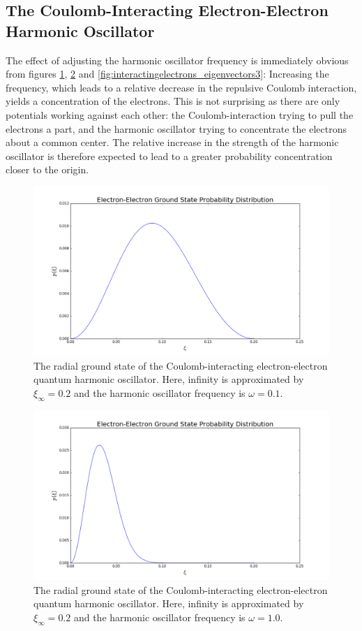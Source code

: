 \documentclass[reprint,english]{revtex4-1}
\begin{document}
\subsection{The Coulomb-Interacting Electron-Electron Harmonic Oscillator}
The effect of adjusting the harmonic oscillator frequency is immediately obvious from figures \ref{fig:interactingelectrons_eigenvectors1}, \ref{fig:interactingelectrons_eigenvectors2} and \ref{fig:interactingelectrons_eigenvectors3}: Increasing the frequency, which leads to a relative decrease in the repulsive Coulomb interaction, yields a concentration of the electrons. This is not surprising as there are only potentials working against each other: the Coulomb-interaction trying to pull the electrons a part, and the harmonic oscillator trying to concentrate the electrons about a common center. The relative increase in the strength of the harmonic oscillator is therefore expected to lead to a greater probability concentration closer to the origin.
\begin{figure}[h]
\centering
\includegraphics[scale=0.275]{InteractingElectrons/plots/prob200_1.png}
\caption{The radial ground state of the Coulomb-interacting electron-electron quantum harmonic oscillator. Here, infinity is approximated by \(\xi_\infty=0.2\) and the harmonic oscillator frequency is \(\omega=0.1\).}
\label{fig:interactingelectrons_eigenvectors1}
\end{figure}
\begin{figure}[h!]
\centering
\includegraphics[scale=0.275]{InteractingElectrons/plots/prob200_10.png}
\caption{The radial ground state of the Coulomb-interacting electron-electron quantum harmonic oscillator. Here, infinity is approximated by \(\xi_\infty=0.2\) and the harmonic oscillator frequency is \(\omega=1.0\).}
\label{fig:interactingelectrons_eigenvectors2}
\end{figure}
\end{document}
